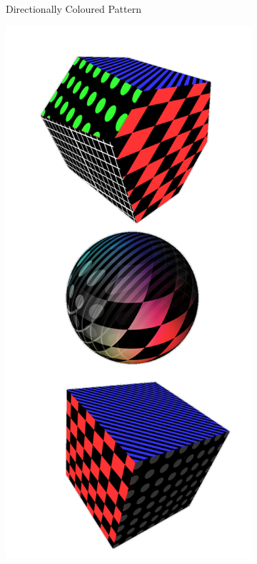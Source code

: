 \documentclass{l4proj}
\begin{document}
\begin{figure}
\begin{subfigure}[b]{0.32\textwidth}
    \caption{
      Directionally Coloured Pattern
    }
    \label{fig:tex2}
  \end{subfigure}
  \begin{subfigure}[b]{0.32\textwidth}
    \includegraphics[width=\textwidth]{images/textures/pattern-rgbw.png}

\end{subfigure}
\end{figure}
\end{document}
